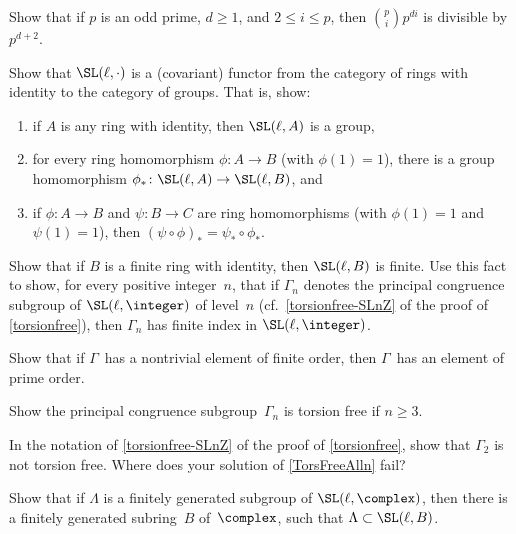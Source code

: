 \begin{exercises}


\item \label{TorsionErrorTerm}
Show that if $p$ is an odd prime, $d \ge 1$, and $2 \le i \le p$, then $\binom{p}{i} p^{di}$ is divisible by $p^{d + 2}$.

\item \label{SLfunctor}
 Show that $\SL(\ell,\cdot)$ is a (covariant) functor
from the category of rings with identity to the category of
groups. That is, show:
 \begin{enumerate}
 \item if $A$ is any ring with identity, then
$\SL(\ell,A)$ is a group,
 \item for every ring homomorphism $\phi \colon A \to B$
(with $\phi(1) = 1$), there is a group
homomorphism $\phi_* \colon \SL(\ell,A) \to \SL(\ell,B)$,
and
 \item if $\phi \colon A \to B$ and $\psi \colon B \to C$
are ring homomorphisms (with $\phi(1) = 1$ and $\psi(1) =
1$), then $(\psi \circ \phi)_* = \psi_* \circ \phi_*$.
 \end{enumerate}

\item \label{CSGfinite}
 Show that if $B$ is a finite ring with identity, then
$\SL(\ell,B)$ is finite. Use this fact to show, for every
positive integer~$n$, that if $\Gamma_n$ denotes the
principal congruence subgroup of $\SL(\ell,\integer)$ of
level~$n$ (cf.\ \cref{torsionfree-SLnZ} of the proof of 
\cref{torsionfree}), then $\Gamma_n$ has finite index
in $\SL(\ell,\integer)$.

\item \label{torsion->prime}
 Show that if $\Gamma$~has a nontrivial element of finite
order, then $\Gamma$~has an element of prime order.

\item \label{TorsFreeAlln}
Show the principal congruence subgroup~$\Gamma_n$ is torsion free if $n \ge 3$.

\item \label{Gamma2HasTorsion}
 In the notation of \cref{torsionfree-SLnZ} of
the proof of  \cref{torsionfree}, show that $\Gamma_2$
is not torsion free. Where does your solution of
\cref{TorsFreeAlln} fail?

\item\label{GammaFG->fgRing}
 Show that if $\Lambda$ is a finitely generated subgroup of
$\SL(\ell,\complex)$, then there is a finitely generated
subring~$B$ of~$\complex$, such that $\Lambda \subset
\SL(\ell,B)$.


\end{exercises}
